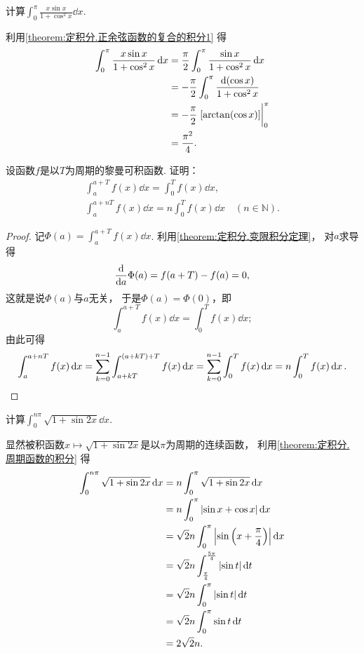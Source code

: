 \begin{example}
计算\(\int_0^\pi \frac{x \sin x}{1 + \cos^2 x} \dd{x}\).
\begin{solution}
利用\cref{theorem:定积分.正余弦函数的复合的积分1} 得\begin{align*}
	\int_0^\pi \frac{x \sin x}{1 + \cos^2 x} \dd{x}
	&= \frac\pi2 \int_0^\pi \frac{\sin x}{1 + \cos^2 x} \dd{x} \\
	&= -\frac\pi2 \int_0^\pi \frac{\dd(\cos x)}{1 + \cos^2 x} \\
	&= -\frac\pi2 \eval{[\arctan(\cos x)]}_0^\pi \\
	&= \frac{\pi^2}4.
\end{align*}
\end{solution}
\end{example}

\begin{proposition}\label{theorem:定积分.周期函数的积分}
设函数\(f\)是以\(T\)为周期的黎曼可积函数.
证明：\begin{gather}
	\int_a^{a+T} f(x) \dd{x} = \int_0^T f(x) \dd{x}, \\
	\int_a^{a+nT} f(x) \dd{x} = n\int_0^T f(x) \dd{x}
	\quad(n\in\mathbb{N}).
\end{gather}
\begin{proof}
记\(\Phi(a) = \int_a^{a+T} f(x) \dd{x}\).
利用\cref{theorem:定积分.变限积分定理}，
对\(a\)求导得\[
	\dv{a} \Phi(a) = f(a+T) - f(a) = 0,
\]
这就是说\(\Phi(a)\)与\(a\)无关，
于是\(\Phi(a) = \Phi(0)\)，即\[
	\int_a^{a+T} f(x) \dd{x} = \int_0^T f(x) \dd{x};
\]
由此可得\[
	\int_a^{a+nT} f(x) \dd{x}
	= \sum_{k=0}^{n-1} \int_{a+kT}^{(a+kT)+T} f(x) \dd{x}
	= \sum_{k=0}^{n-1} \int_0^T f(x) \dd{x}
	= n \int_0^T f(x) \dd{x}.
	\qedhere
\]
\end{proof}
\end{proposition}

\begin{example}
计算\(\int_0^{n\pi} \sqrt{1 + \sin2x} \dd{x}\).
\begin{solution}
显然被积函数\(x \mapsto \sqrt{1 + \sin2x}\)是以\(\pi\)为周期的连续函数，
利用\cref{theorem:定积分.周期函数的积分} 得\begin{align*}
	\int_0^{n\pi} \sqrt{1 + \sin2x} \dd{x}
	&= n \int_0^\pi \sqrt{1 + \sin2x} \dd{x} \\
	&= n \int_0^\pi \abs{\sin x + \cos x} \dd{x} \\
	&= \sqrt2 n \int_0^\pi \abs{\sin\left(x + \frac\pi4\right)} \dd{x} \\
	&= \sqrt2 n \int_{\frac\pi4}^{\frac{5\pi}4} \abs{\sin t} \dd{t} \\
	&= \sqrt2 n \int_0^\pi \abs{\sin t} \dd{t} \\
	&= \sqrt2 n \int_0^\pi \sin t \dd{t} \\
	&= 2\sqrt2 n.
\end{align*}
\end{solution}
\end{example}

